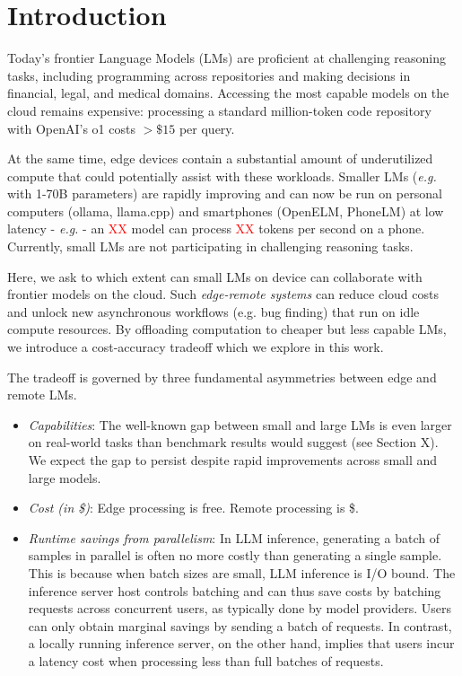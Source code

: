 \section{Introduction}
\label{sec:intro}
Today's frontier Language Models (LMs) are proficient at challenging reasoning tasks, including programming across repositories and making decisions in financial, legal, and medical domains. Accessing the most capable models on the cloud remains expensive: processing a standard million-token code repository with OpenAI's o1 costs $>\$15$ per query. 

At the same time, edge devices contain a substantial amount of underutilized compute that could potentially assist with these workloads. Smaller LMs (\textit{e.g.} with 1-70B parameters) are rapidly improving and can now be run on personal computers (ollama, llama.cpp) and smartphones (OpenELM, PhoneLM) at low latency - \textit{e.g.} - an \textcolor{red}{XX} model can process \textcolor{red}{XX} tokens per second on a phone. Currently, small LMs are not participating in challenging reasoning tasks. 

Here, we ask to which extent can small LMs on device can collaborate with frontier models on the cloud. Such \emph{edge-remote systems} can reduce cloud costs and unlock new asynchronous workflows (e.g. bug finding) that run on idle compute resources. By offloading computation to cheaper but less capable LMs, we introduce a cost-accuracy tradeoff which we explore in this work.

The tradeoff is governed by three fundamental asymmetries between edge and remote LMs. 

\begin{itemize}
    \item \emph{Capabilities}: The well-known gap between small and large LMs is even larger on real-world tasks than benchmark results would suggest (see Section X). We expect the gap to persist despite rapid improvements across small and large models.
    
    \item \emph{Cost (in \$)}: Edge processing is free. Remote processing is \$.

    \item \emph{Runtime savings from parallelism}: In LLM inference, generating a batch of samples in parallel is often no more costly than generating a single sample. This is because when batch sizes are small, LLM inference is I/O bound. The inference server host controls batching and can thus save costs by batching requests across concurrent users, as typically done by model providers. Users can only obtain marginal savings by sending a batch of requests. In contrast, a locally running inference server, on the other hand, implies that users incur a latency cost when processing less than full batches of requests.
\end{itemize}

